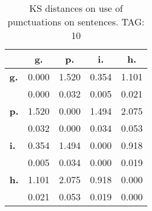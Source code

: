 \begin{table}[h!]
\begin{center}
\begin{tabular}{| l || c | c | c | c |}\hline
 & {\bf g.} & {\bf p.} & {\bf i.} & {\bf h.} \\\hline\hline
{\bf g.} & 0.000 & 1.520 & 0.354 & 1.101 \\
{\bf } & 0.000 & 0.032 & 0.005 & 0.021 \\\hline
{\bf p.} & 1.520 & 0.000 & 1.494 & 2.075 \\
{\bf } & 0.032 & 0.000 & 0.034 & 0.053 \\\hline
{\bf i.} & 0.354 & 1.494 & 0.000 & 0.918 \\
{\bf } & 0.005 & 0.034 & 0.000 & 0.019 \\\hline
{\bf h.} & 1.101 & 2.075 & 0.918 & 0.000 \\
{\bf } & 0.021 & 0.053 & 0.019 & 0.000 \\\hline
\end{tabular}
\caption{KS distances on use of punctuations on sentences. TAG: 10}
\end{center}
\end{table}